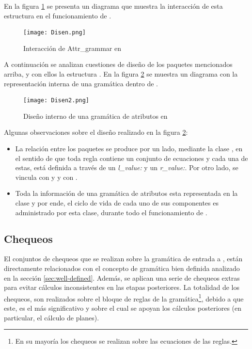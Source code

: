 En la figura \ref{fig:disen} se presenta un diagrama que muestra la interacción de esta estructura en el funcionamiento de \maggen.

\begin{figure}[!ht]\centering
\texttt{[image: Disen.png]}
\caption{\label{fig:disen}Interacción de Attr\_grammar en \maggen}
\end{figure}

A continuación se analizan cuestiones de diseño de los paquetes mencionados arriba, y con ellos la estructura .  En la figura \ref{fig:disen2} se muestra un diagrama con la representación interna de una gramática dentro de \maggen.

\begin{figure}[!ht]\centering
\texttt{[image: Disen2.png]}
\caption{\label{fig:disen2}Diseño interno de una gramática de atributos en \maggen}
\end{figure}

Algunas observaciones sobre el diseño realizado en la figura \ref{fig:disen2}:

\begin{itemize}
\item La relación entre los paquetes se produce por un lado, mediante la clase , en el sentido de que toda regla contiene un conjunto de ecuaciones y cada una de estas, está definida a través de un \textit{l\_value:} y un \textit{r\_value:}. Por otro lado,  se vincula con  y  y  con .

\item Toda la información de una gramática de atributos esta representada en la clase  y por ende, el ciclo de vida de cada uno de sus componentes es administrado por esta clase, durante todo el funcionamiento de \maggen. 
\end{itemize}

\subsection{Chequeos}
\label{subsec:check}

El conjuntos de chequeos que se realizan sobre la gramática de entrada a \maggen, están directamente relacionados con el concepto de gramática bien definida analizado en la sección \ref{sec:well-defined}. Además, se aplican una serie de chequeos extras para evitar cálculos inconsistentes en las etapas posteriores. La totalidad de los chequeos, son realizados sobre el bloque de reglas de la gramática\footnote{En su mayoría los chequeos se realizan sobre las ecuaciones de las reglas.}, debido a que este, es el más significativo y sobre el cual se apoyan los cálculos posteriores (en particular, el cálculo de planes).

